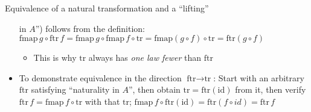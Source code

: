 \documentclass[english]{beamer}
\begin{document}
\begin{frame}{Equivalence of a natural transformation and a ``lifting''}
\begin{itemize}
in $A$'') follows from the definition: {\footnotesize{}$\text{fmap}\,g\circ\text{ftr}\,f=\text{fmap}\,g\circ\text{fmap}\,f\circ\text{tr}=\text{fmap}\left(g\circ f\right)\circ\text{tr}=\text{ftr}\left(g\circ f\right)$} 
\begin{itemize}
\item This is why {\footnotesize{}$\text{tr}$} always has \emph{one law
fewer} than {\footnotesize{}$\text{ftr}$}{\footnotesize \par}
\end{itemize}
\item To demonstrate equivalence in the direction {\footnotesize{}$\text{ftr}\rightarrow\text{tr}$}:
Start with an arbitrary {\footnotesize{}$\text{ftr}$} satisfying
``naturality in $A$'', then obtain {\footnotesize{}$\text{tr}=\text{ftr}\left(\text{id}\right)$}
from it, then verify {\footnotesize{}$\text{ftr}\,f=\text{fmap}\,f\circ\text{tr}$}
with that {\footnotesize{}$\text{tr}$}; {\footnotesize{}$\text{fmap}\,f\circ\text{ftr}\left(\text{id}\right)=\text{ftr}\left(f\circ id\right)=\text{ftr}\,f$}{\footnotesize \par}
\end{itemize}
\end{frame}
\end{document}
